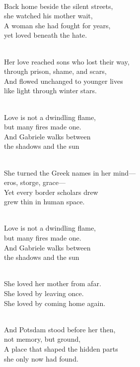 \begin{lyrics}

\\
Back home beside the silent streets,\\
she watched his mother wait,\\
A woman she had fought for years,\\
yet loved beneath the hate.

\\
Her love reached sons who lost their way,\\
through prison, shame, and scars,\\
And flowed unchanged to younger lives\\
like light through winter stars.

\\
Love is not a dwindling flame,\\
but many fires made one.\\
And Gabriele walks between\\
the shadows and the sun

\\
She turned the Greek names in her mind—\\
eros, storge, grace—\\
Yet every border scholars drew\\
grew thin in human space.

\\
Love is not a dwindling flame,\\
but many fires made one.\\
And Gabriele walks between\\
the shadows and the sun

\\
She loved her mother from afar.\\
She loved by leaving once.\\
She loved by coming home again.

\\
And Potsdam stood before her then,\\
not memory, but ground,\\
A place that shaped the hidden parts\\
she only now had found.


\end{lyrics}
